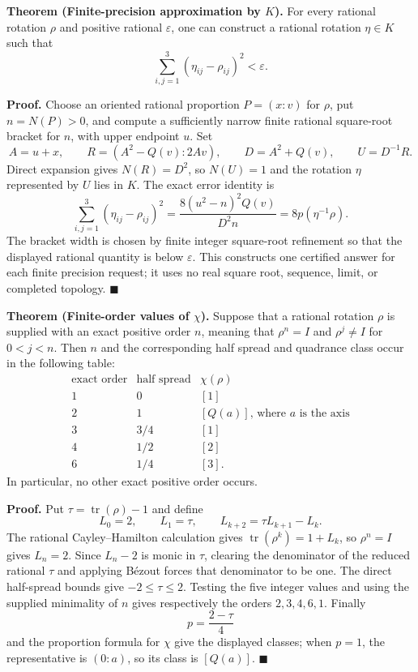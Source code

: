 \documentclass[11pt]{article}
\newcommand{\tr}{\operatorname{tr}}
\begin{document}
\medskip
\noindent\textbf{Theorem (Finite-precision approximation by \(K\)).}
For every rational rotation \(\rho\) and positive rational
\(\varepsilon\), one can construct a rational rotation \(\eta\in K\) such
that
\[
 \sum_{i,j=1}^3(\eta_{ij}-\rho_{ij})^2<\varepsilon.
\]

\smallskip
\noindent\textbf{Proof.}
Choose an oriented rational proportion \(P=(x:v)\) for \(\rho\), put
\(n=N(P)>0\), and compute a sufficiently narrow finite rational
square-root bracket for \(n\), with upper endpoint \(u\).  Set
\[
 A=u+x,\qquad
 R=(A^2-Q(v):2Av),\qquad
 D=A^2+Q(v),\qquad U=D^{-1}R.
\]
Direct expansion gives \(N(R)=D^2\), so \(N(U)=1\) and the rotation
\(\eta\) represented by \(U\) lies in \(K\).  The exact error identity is
\[
 \sum_{i,j=1}^3(\eta_{ij}-\rho_{ij})^2
 =\frac{8(u^2-n)^2Q(v)}{D^2n}
 =8p(\eta^{-1}\rho).
\]
The bracket width is chosen by finite integer square-root refinement so that
the displayed rational quantity is below \(\varepsilon\).  This constructs
one certified answer for each finite precision request; it uses no real
square root, sequence, limit, or completed topology.
\hfill\(\blacksquare\)

\medskip
\noindent\textbf{Theorem (Finite-order values of \(\chi\)).}
Suppose that a rational rotation \(\rho\) is supplied with an exact positive
order \(n\), meaning that \(\rho^n=I\) and
\(\rho^j\ne I\) for \(0<j<n\).  Then \(n\) and the corresponding half spread
and quadrance class occur in the following table:
\[
\begin{array}{c|c|c}
\text{exact order}&\text{half spread}&\chi(\rho)\\ \hline
1&0&[1]\\
2&1&[Q(a)]\text{, where }a\text{ is the axis}\\
3&3/4&[1]\\
4&1/2&[2]\\
6&1/4&[3].
\end{array}
\]
In particular, no other exact positive order occurs.

\smallskip
\noindent\textbf{Proof.}
Put \(\tau=\tr(\rho)-1\) and define
\[
 L_0=2,\qquad L_1=\tau,\qquad
 L_{k+2}=\tau L_{k+1}-L_k.
\]
The rational Cayley--Hamilton calculation gives
\(\tr(\rho^k)=1+L_k\), so \(\rho^n=I\) gives \(L_n=2\).  Since
\(L_n-2\) is monic in \(\tau\), clearing the denominator of the reduced
rational \(\tau\) and applying B\'ezout forces that denominator to be one.
The direct half-spread bounds give \(-2\leq\tau\leq2\).  Testing the five
integer values and using the supplied minimality of \(n\) gives respectively
the orders \(2,3,4,6,1\).  Finally
\[
 p=\frac{2-\tau}{4}
\]
and the proportion formula for \(\chi\) give the displayed classes; when
\(p=1\), the representative is \((0:a)\), so its class is
\([Q(a)]\). \hfill\(\blacksquare\)
\end{document}
